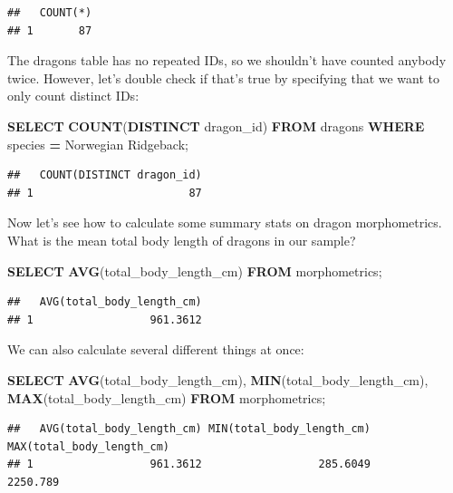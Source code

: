 \documentclass[
]{book}
\newenvironment{Shaded}{\begin{snugshade}}{\end{snugshade}}
\newcommand{\FunctionTok}[1]{\textcolor[rgb]{0.13,0.29,0.53}{\textbf{#1}}}
\newcommand{\KeywordTok}[1]{\textcolor[rgb]{0.13,0.29,0.53}{\textbf{#1}}}
\newcommand{\NormalTok}[1]{#1}
\newcommand{\OperatorTok}[1]{\textcolor[rgb]{0.81,0.36,0.00}{\textbf{#1}}}
\newcommand{\StringTok}[1]{\textcolor[rgb]{0.31,0.60,0.02}{#1}}
\begin{document}
\begin{verbatim}
##   COUNT(*)
## 1       87
\end{verbatim}

The dragons table has no repeated IDs, so we shouldn't have counted anybody
twice. However, let's double check if that's true by specifying that we want
to only count distinct IDs:

\begin{Shaded}
\begin{Highlighting}[]
\KeywordTok{SELECT} \FunctionTok{COUNT}\NormalTok{(}\KeywordTok{DISTINCT}\NormalTok{ dragon\_id) }
\KeywordTok{FROM}\NormalTok{ dragons}
\KeywordTok{WHERE}\NormalTok{ species }\OperatorTok{=} \StringTok{\textquotesingle{}Norwegian Ridgeback\textquotesingle{}}\NormalTok{;}
\end{Highlighting}
\end{Shaded}

\begin{verbatim}
##   COUNT(DISTINCT dragon_id)
## 1                        87
\end{verbatim}

Now let's see how to calculate some summary stats on dragon morphometrics. What
is the mean total body length of dragons in our sample?

\begin{Shaded}
\begin{Highlighting}[]
\KeywordTok{SELECT} \FunctionTok{AVG}\NormalTok{(total\_body\_length\_cm)}
\KeywordTok{FROM}\NormalTok{ morphometrics;}
\end{Highlighting}
\end{Shaded}

\begin{verbatim}
##   AVG(total_body_length_cm)
## 1                  961.3612
\end{verbatim}

We can also calculate several different things at once:

\begin{Shaded}
\begin{Highlighting}[]
\KeywordTok{SELECT} \FunctionTok{AVG}\NormalTok{(total\_body\_length\_cm), }\FunctionTok{MIN}\NormalTok{(total\_body\_length\_cm), }\FunctionTok{MAX}\NormalTok{(total\_body\_length\_cm)}
\KeywordTok{FROM}\NormalTok{ morphometrics;}
\end{Highlighting}
\end{Shaded}

\begin{verbatim}
##   AVG(total_body_length_cm) MIN(total_body_length_cm) MAX(total_body_length_cm)
## 1                  961.3612                  285.6049                  2250.789
\end{verbatim}
\end{document}
